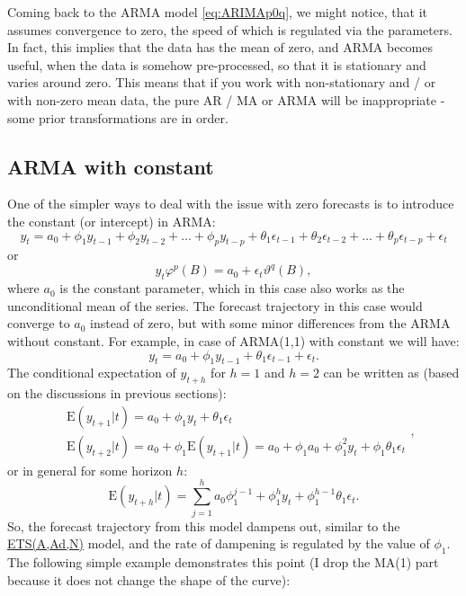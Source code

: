 \documentclass[
]{book}
\theoremstyle{definition}
\theoremstyle{definition}
\theoremstyle{definition}
\theoremstyle{definition}
\theoremstyle{remark}
\begin{document}
Coming back to the ARMA model \eqref{eq:ARIMAp0q}, we might notice, that it assumes convergence to zero, the speed of which is regulated via the parameters. In fact, this implies that the data has the mean of zero, and ARMA becomes useful, when the data is somehow pre-processed, so that it is stationary and varies around zero. This means that if you work with non-stationary and / or with non-zero mean data, the pure AR / MA or ARMA will be inappropriate - some prior transformations are in order.

\hypertarget{ARMAConstant}{%
\subsection{ARMA with constant}\label{ARMAConstant}}

One of the simpler ways to deal with the issue with zero forecasts is to introduce the constant (or intercept) in ARMA:
\begin{equation}
  {y}_{t} = a_0 + \phi_1 y_{t-1} + \phi_2 y_{t-2} + \dots + \phi_p y_{t-p} + \theta_1 \epsilon_{t-1} + \theta_2 \epsilon_{t-2} + \dots + \theta_p \epsilon_{t-p} + \epsilon_t 
  \label{eq:ARIMAp0qExample}
\end{equation}
or
\begin{equation}
  {y}_{t} \varphi^p(B) = a_0 + \epsilon_t \vartheta^q(B) ,
  \label{eq:ARIMAp0qCompact}
\end{equation}
where \(a_0\) is the constant parameter, which in this case also works as the unconditional mean of the series. The forecast trajectory in this case would converge to \(a_0\) instead of zero, but with some minor differences from the ARMA without constant. For example, in case of ARMA(1,1) with constant we will have:
\begin{equation}
  {y}_{t} = a_0 + \phi_1 y_{t-1} + \theta_1 \epsilon_{t-1} + \epsilon_t .
  \label{eq:ARIMA101ConstExample01}
\end{equation}
The conditional expectation of \(y_{t+h}\) for \(h=1\) and \(h=2\) can be written as (based on the discussions in previous sections):
\begin{equation}
\begin{aligned}
  & \mathrm{E}({y}_{t+1}|t) = a_0 + \phi_1 y_{t} + \theta_1 \epsilon_{t} \\
  & \mathrm{E}({y}_{t+2}|t) = a_0 + \phi_1 \mathrm{E}(y_{t+1}|t) = a_0 + \phi_1 a_0 + \phi_1^2 y_{t} + \phi_1 \theta_1 \epsilon_t
\end{aligned} ,
  \label{eq:ARIMA101ConstExampleForecasth1}
\end{equation}
or in general for some horizon \(h\):
\begin{equation}
  \mathrm{E}({y}_{t+h}|t) = \sum_{j=1}^h a_0\phi_1^{j-1} + \phi_1^h y_{t} + \phi_1^{h-1} \theta_1 \epsilon_{t} .
  \label{eq:ARIMA101ConstExampleForecast}
\end{equation}
So, the forecast trajectory from this model dampens out, similar to the \protect\hyperlink{ETSAAdN}{ETS(A,Ad,N)} model, and the rate of dampening is regulated by the value of \(\phi_1\). The following simple example demonstrates this point (I drop the MA(1) part because it does not change the shape of the curve):
\end{document}

